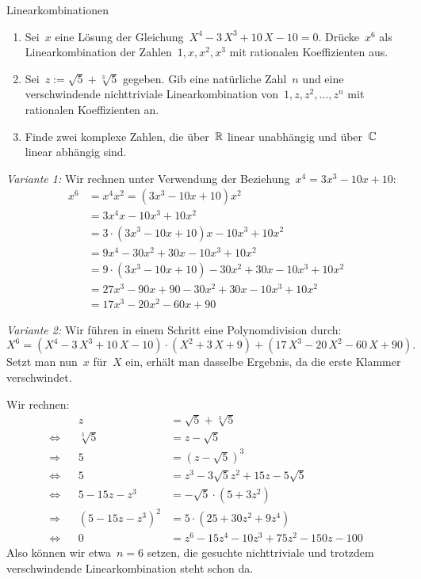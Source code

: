 \documentclass{algblatt}
\begin{document}
\begin{aufgabe}{Linearkombinationen}
\begin{enumerate}
\item Sei~$x$ eine Lösung der Gleichung~$X^4-3\,X^3+10\,X-10=0$. Drücke~$x^6$
als Linearkombination der Zahlen~$1,x,x^2,x^3$ mit rationalen Koeffizienten
aus.
\item Sei~$z := \sqrt{5} + \sqrt[3]{5}$ gegeben. Gib eine
natürliche Zahl~$n$ und eine verschwindende nichttriviale Linearkombination
von~$1,z,z^2,\ldots,z^n$ mit rationalen Koeffizienten an.
\item Finde zwei komplexe Zahlen, die über~$\mathbb{R}$ linear unabhängig und
über~$\mathbb{C}$ linear abhängig sind.
\end{enumerate}

\begin{loesungE}
\item \emph{Variante 1:} Wir rechnen unter Verwendung der Beziehung~$x^4 = 3x^3
- 10x + 10$:
\begin{align*}
  x^6 &= x^4 x^2 = (3x^3 - 10x + 10) x^2 \\
  &= 3x^4 x - 10x^3 + 10x^2 \\
  &= 3 \cdot (3x^3 - 10x + 10)x - 10x^3 + 10x^2 \\
  &= 9x^4 - 30x^2 + 30x - 10x^3 + 10x^2 \\
  &= 9 \cdot (3x^3 - 10x + 10) - 30x^2 + 30x - 10x^3 + 10x^2 \\
  &= 27x^3 - 90x + 90 - 30x^2 + 30x - 10x^3 + 10x^2 \\
  &= 17x^3 - 20x^2 - 60x + 90
\end{align*}

\emph{Variante 2:} Wir führen in einem Schritt eine Polynomdivision durch:
\[ X^6 = (X^4-3\,X^3+10\,X-10) \cdot (X^2 + 3\,X + 9) + (17\,X^3 - 20\,X^2 -
60\,X + 90). \]
Setzt man nun~$x$ für~$X$ ein, erhält man dasselbe Ergebnis, da die erste
Klammer verschwindet.

\item Wir rechnen:
\begin{align*}
  && z &= \sqrt{5} + \sqrt[3]{5} \\
  \Longleftrightarrow && \sqrt[3]{5} &= z - \sqrt{5} \\
  \Longrightarrow && 5 &= (z - \sqrt{5})^3 \\
  \Longleftrightarrow && 5 &= z^3 - 3\sqrt{5}z^2 + 15z - 5\sqrt{5} \\
  \Longleftrightarrow && 5-15z-z^3 &= -\sqrt{5} \cdot (5 + 3z^2) \\
  \Longrightarrow && (5-15z-z^3)^2 &= 5 \cdot (25 + 30z^2 + 9z^4) \\
  \Longleftrightarrow && 0 &= z^6 - 15z^4 - 10z^3 + 75z^2 - 150z - 100 
\end{align*}
Also können wir etwa~$n = 6$ setzen, die gesuchte nichttriviale und trotzdem
verschwindende Linearkombination steht schon da.


\end{loesungE}
\end{aufgabe}
\end{document}

